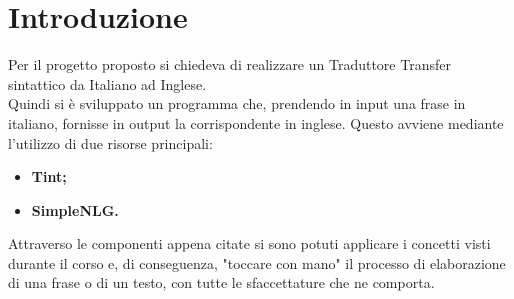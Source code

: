 \chapter*{Introduzione} 

Per il progetto proposto si chiedeva di realizzare un Traduttore Transfer sintattico da Italiano ad Inglese.\\
Quindi si è sviluppato un programma che, prendendo in input una frase in italiano, fornisse in output la corrispondente in inglese. Questo avviene mediante l'utilizzo di due risorse principali:
\begin{itemize}
	\item \textbf{Tint;}
	\item \textbf{SimpleNLG.}
\end{itemize}
Attraverso le componenti appena citate si sono potuti applicare i concetti visti durante il corso e, di conseguenza, "toccare con mano" il processo di elaborazione di una frase o di un testo, con tutte le sfaccettature che ne comporta.



 